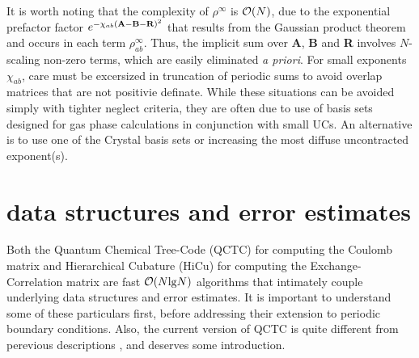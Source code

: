 \commentoutA{\documentclass[prb,aps,twocolumn,showpacs,twocolumngrid,superbib]{revtex4}}
\begin{document}
It is worth noting that the complexity of $\rho^{\scriptscriptstyle \infty}$ is ${\cal O}(N)$, due to the
exponential prefactor factor $e^{- \chi_{ab} ({\bf A}-{\bf B}-{\bf R})^2}$ that results from the Gaussian product theorem
and occurs in each term  $\rho^{\scriptscriptstyle \infty}_{ab}$.  Thus, the implicit sum over {\bf A}, {\bf B} and {\bf R} involves $N$-scaling 
non-zero terms, which are easily eliminated {\em a priori}.  For small exponents  $\chi_{ab}$, care must be excersized in 
truncation of periodic sums to avoid overlap matrices that are not positivie definate.  While these situations
can be avoided simply with tighter neglect criteria, they are often due to use of basis sets designed for gas phase 
calculations in conjunction with small UCs.  An alternative is to use one of the Crystal basis sets \cite{} or 
increasing the most diffuse uncontracted exponent(s).

\pagebreak

\section{data structures and error estimates}\label{datastruct}

Both the Quantum Chemical Tree-Code (QCTC) \cite{} for computing the Coulomb matrix and Hierarchical Cubature (HiCu)
for computing the Exchange-Correlation matrix are fast ${\cal O}(N {\rm lg} N)$ algorithms that 
intimately couple underlying data structures and error estimates.  It is important to understand some 
of these particulars first, before addressing their extension to periodic boundary conditions.
Also, the current version of QCTC is quite different from perevious descriptions \cite{}, and deserves some
introduction.  
\end{document}
